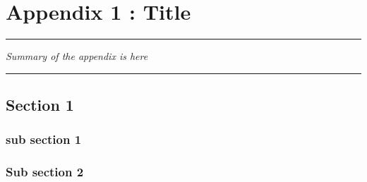 
     

\appendix
\renewcommand\chaptername{Appendix }


\lhead[\fancyplain{}{\leftmark}]%
      {\fancyplain{}{}} %
\chead[\fancyplain{}{}]%
      {\fancyplain{}{}}
\rhead[\fancyplain{}{}]%
      {\fancyplain{}{\rightmark}}%
\lfoot[\fancyplain{}{}]%
      {\fancyplain{}{}}
\cfoot[\fancyplain{}{\thepage}]%
      {\fancyplain{}{\thepage}} %
\rfoot[\fancyplain{}{}]%
     {\fancyplain{}{\scriptsize}}




\chapter{Appendix 1 : Title}
\label{Ann:1}


\begin{center}
\rule{0.7\linewidth}{.5pt}
\begin{minipage}{0.7\linewidth}
\smallskip

\textit{
Summary of the appendix is here
}

\end{minipage}
\smallskip
\rule{0.7\linewidth}{.5pt}
\end{center}

\minitoc
\newpage

\section{Section 1}
\subsection{sub section 1}
\blindtext
\subsection{Sub section 2}
\blindtext





